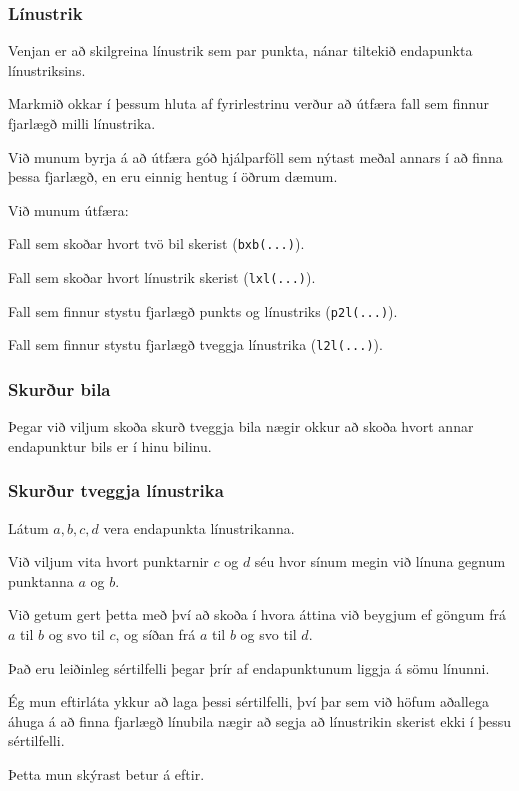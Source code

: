 \fi

{
	\frametitle{Línustrik}
	{
		\item<1-> Venjan er að skilgreina línustrik sem par punkta, nánar tiltekið endapunkta línustriksins.
		\item<2-> Markmið okkar í þessum hluta af fyrirlestrinu verður að útfæra fall sem finnur fjarlægð milli línustrika.
		\item<3-> Við munum byrja á að útfæra góð hjálparföll sem nýtast meðal annars í að finna þessa fjarlægð, en eru einnig
			hentug í öðrum dæmum.
	}
}

{
	{
		\item<1-> Við munum útfæra:
		{
			\item<2-> Fall sem skoðar hvort tvö bil skerist (\texttt{bxb(...)}).
			\item<3-> Fall sem skoðar hvort línustrik skerist (\texttt{lxl(...)}).
			\item<4-> Fall sem finnur stystu fjarlægð punkts og línustriks (\texttt{p2l(...)}).
			\item<5-> Fall sem finnur stystu fjarlægð tveggja línustrika (\texttt{l2l(...)}).
		}
	}
}

{
	\frametitle{Skurður bila}
	{
		\item<1-> Þegar við viljum skoða skurð tveggja bila nægir okkur að skoða hvort annar endapunktur bils er í hinu bilinu.
		\item<2->[] 
	}
}

{
	\frametitle{Skurður tveggja línustrika}
	{
		\item<1-> Látum $a, b, c, d$ vera endapunkta línustrikanna.
		\item<2-> Við viljum vita hvort punktarnir $c$ og $d$ séu hvor sínum megin við línuna gegnum punktanna $a$ og $b$.
		\item<3-> Við getum gert þetta með því að skoða í hvora áttina við beygjum ef göngum frá $a$ til $b$ og svo til $c$,
					og síðan frá $a$ til $b$ og svo til $d$.
	}
}

{
	{
		\item<1-> Það eru leiðinleg sértilfelli þegar þrír af endapunktunum liggja á sömu línunni.
		\item<2-> Ég mun eftirláta ykkur að laga þessi sértilfelli, því þar sem við höfum aðallega
			áhuga á að finna fjarlægð línubila nægir að segja að línustrikin skerist ekki í þessu sértilfelli.
		\item<3-> Þetta mun skýrast betur á eftir.
	}
}

